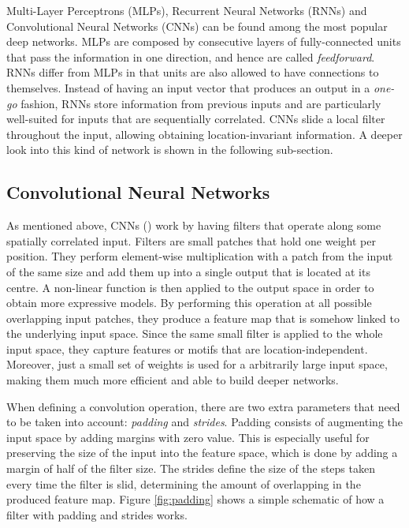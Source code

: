Multi-Layer Perceptrons (MLPs), Recurrent Neural Networks (RNNs) and Convolutional Neural Networks (CNNs) can be found among the most popular deep networks. MLPs are composed by consecutive layers of fully-connected units that pass the information in one direction, and hence are called \textit{feedforward}. RNNs differ from MLPs in that units are also allowed to have connections to themselves. Instead of having an input vector that produces an output in a \textit{one-go} fashion, RNNs store information from previous inputs and are particularly well-suited for inputs that are sequentially correlated. CNNs slide a local filter throughout the input, allowing obtaining location-invariant information. A deeper look into this kind of network is shown in the following sub-section.

	\subsection{Convolutional Neural Networks} \label{sect:cnn}
	As mentioned above, CNNs (\cite{LeCun1998}) work by having filters that operate along some spatially correlated input. Filters are small patches that hold one weight per position. They perform element-wise multiplication with a patch from the input of the same size and add them up into a single output that is located at its centre. A non-linear function is then applied to the output space in order to obtain more expressive models. By performing this operation at all possible overlapping input patches, they produce a feature map that is somehow linked to the underlying input space. Since the same small filter is applied to the whole input space, they capture features or motifs that are location-independent. Moreover, just a small set of weights is used for a arbitrarily large input space, making them much more efficient and able to build deeper networks.
	
	When defining a convolution operation, there are two extra parameters that need to be taken into account: \textit{padding} and \textit{strides}. Padding consists of augmenting the input space by adding margins with zero value. This is especially useful for preserving the size of the input into the feature space, which is done by adding a margin of half of the filter size. The strides define the size of the steps taken every time the filter is slid, determining the amount of overlapping in the produced feature map. Figure \ref{fig:padding} shows a simple schematic of how a filter with padding and strides works.
	
